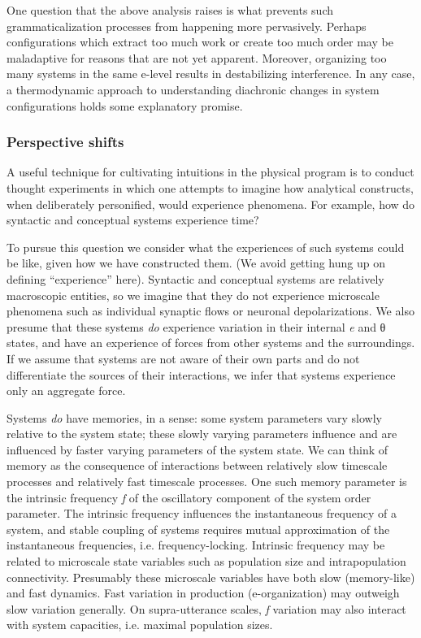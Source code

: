 One question that the above analysis raises is what prevents such grammaticalization processes from happening more pervasively. Perhaps configurations which extract too much work or create too much order may be maladaptive for reasons that are not yet apparent. Moreover, organizing too many systems in the same e-level results in destabilizing interference. In any case, a thermodynamic approach to understanding diachronic changes in system configurations holds some explanatory promise.

\subsubsection{Perspective shifts}

A useful technique for cultivating intuitions in the physical program is to conduct thought experiments in which one attempts to imagine how analytical constructs, when deliberately personified, would experience phenomena. For example, how do syntactic and conceptual systems experience time? 

  To pursue this question we consider what the experiences of such systems could be like, given how we have constructed them. (We avoid getting hung up on defining “experience” here). Syntactic and conceptual systems are relatively macroscopic entities, so we imagine that they do not experience microscale phenomena such as individual synaptic flows or neuronal depolarizations. We also presume that these systems \textit{do} experience variation in their internal \textit{e} and θ states, and have an experience of forces from other systems and the surroundings. If we assume that systems are not aware of their own parts and do not differentiate the sources of their interactions, we infer that systems experience only an aggregate force. 

  Systems \textit{do} have memories, in a sense: some system parameters vary slowly relative to the system state; these slowly varying parameters influence and are influenced by faster varying parameters of the system state. We can think of memory as the consequence of interactions between relatively slow timescale processes and relatively fast timescale processes. One such memory parameter is the intrinsic frequency \textit{f} of the oscillatory component of the system order parameter. The intrinsic frequency influences the instantaneous frequency of a system, and stable coupling of systems requires mutual approximation of the instantaneous frequencies, i.e. frequency-locking. Intrinsic frequency may be related to microscale state variables such as population size and intrapopulation connectivity. Presumably these microscale variables have both slow (memory-like) and fast dynamics. Fast variation in production (e-organization) may outweigh slow variation generally. On supra-utterance scales, \textit{f} variation may also interact with system capacities, i.e. maximal population sizes. 

